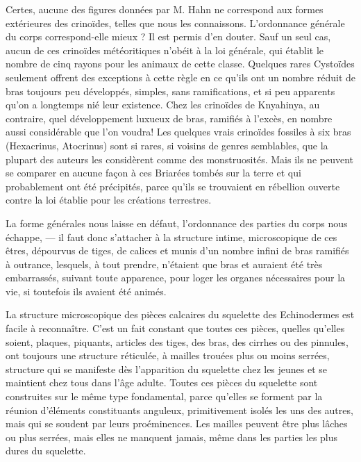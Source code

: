 \documentclass[a4paper, 12pt, oneside, french]{book}
\begin{document}
Certes, aucune des figures données par M. Hahn ne correspond aux formes extérieures des crinoïdes, telles que nous les connaissons. L'ordonnance générale du corps correspond-elle mieux ? Il est permis d'en douter. Sauf un seul cas, aucun de ces crinoïdes météoritiques n'obéit à la loi générale, qui établit le nombre de cinq rayons pour les animaux de cette classe. Quelques rares Cystoïdes seulement offrent des exceptions à cette règle en ce qu'ils ont un nombre réduit de bras toujours peu développés, simples, sans ramifications, et si peu apparents qu'on a longtemps nié leur existence. Chez les crinoïdes de Knyahinya, au contraire, quel développement luxueux de bras, ramifiés à l'excès, en nombre aussi considérable que l'on voudra! Les quelques vrais crinoïdes fossiles à six bras (Hexacrinus, Atocrinus) sont si rares, si voisins de genres semblables, que la plupart des auteurs les considèrent comme des monstruosités. Mais ils ne peuvent se comparer en aucune façon à ces Briarées tombés sur la terre et qui probablement ont été précipités, parce qu'ils se trouvaient en rébellion ouverte contre la loi établie pour les créations terrestres.

La forme générales nous laisse en défaut, l'ordonnance des parties du corps nous échappe, --- il faut donc s'attacher à la structure intime, microscopique de ces êtres, dépourvus de tiges, de calices et munis d'un nombre infini de bras ramifiés à outrance, lesquels, à tout prendre, n'étaient que bras et auraient été très embarrassés, suivant toute apparence, pour loger les organes nécessaires pour la vie, si toutefois ils avaient été animés.

La structure microscopique des pièces calcaires du squelette des Echinodermes est facile à reconnaître. C'est un fait constant que toutes ces pièces, quelles qu'elles soient, plaques, piquants, articles des tiges, des bras, des cirrhes ou des pinnules, ont toujours une structure réticulée, à mailles trouées plus ou moins serrées, structure qui se manifeste dès l'apparition du squelette chez les jeunes et se maintient chez tous dans l'âge adulte. Toutes ces pièces du squelette sont construites sur le même type fondamental, parce qu'elles se forment par la réunion d'éléments constituants anguleux, primitivement isolés les uns des autres, mais qui se soudent par leurs proéminences. Les mailles peuvent être plus lâches ou plus serrées, mais elles ne manquent jamais, même dans les parties les plus dures du squelette.
\end{document}
